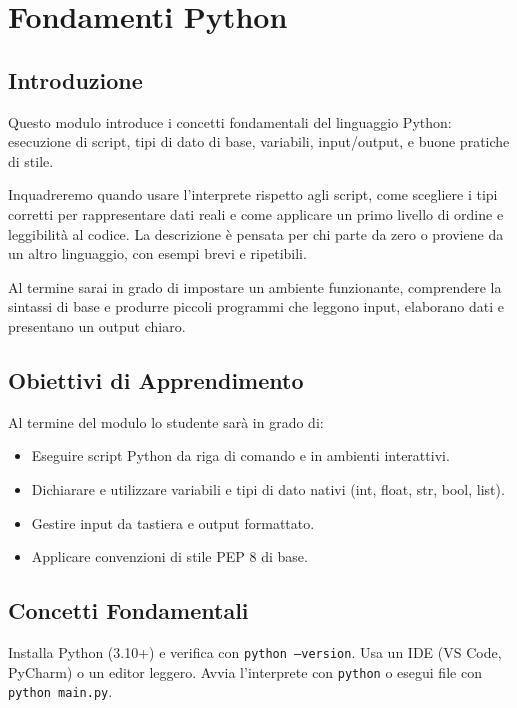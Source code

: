 \chapter{Fondamenti Python}
\label{chap:fondamenti}

\section{Introduzione}
\label{sec:fond-introduzione}
Questo modulo introduce i concetti fondamentali del linguaggio Python: esecuzione di script, tipi di dato di base, variabili, input/output, e buone pratiche di stile.

Inquadreremo quando usare l'interprete rispetto agli script, come scegliere i tipi corretti per rappresentare dati reali e come applicare un primo livello di ordine e leggibilità al codice.
La descrizione è pensata per chi parte da zero o proviene da un altro linguaggio, con esempi brevi e ripetibili.

Al termine sarai in grado di impostare un ambiente funzionante, comprendere la sintassi di base e produrre piccoli programmi che leggono input, elaborano dati e presentano un output chiaro.

\section{Obiettivi di Apprendimento}
\label{sec:fond-obiettivi}
Al termine del modulo lo studente sarà in grado di:
\begin{itemize}
	\item Eseguire script Python da riga di comando e in ambienti interattivi.
	\item Dichiarare e utilizzare variabili e tipi di dato nativi (int, float, str, bool, list).
	\item Gestire input da tastiera e output formattato.
	\item Applicare convenzioni di stile PEP 8 di base.
\end{itemize}

\section{Concetti Fondamentali}
\label{sec:fond-concetti}
\begin{tcolorbox}[title=Setup Ambiente]
	Installa Python (3.10+) e verifica con \texttt{python --version}. Usa un IDE (VS Code, PyCharm) o un editor leggero. Avvia l'interprete con \texttt{python} o esegui file con \texttt{python main.py}.
\end{tcolorbox}

